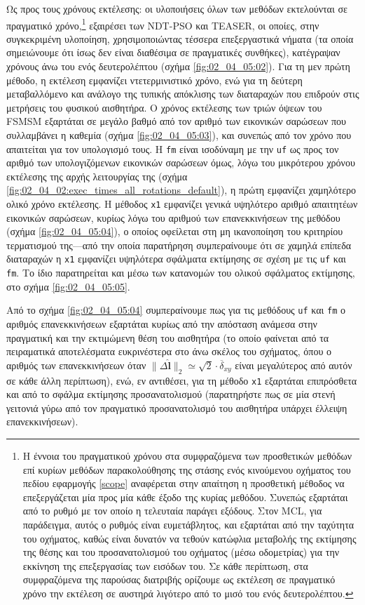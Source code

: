 Ως προς τους χρόνους εκτέλεσης: οι υλοποιήσεις όλων των μεθόδων εκτελούνται σε
πραγματικό χρόνο,\footnote{Η έννοια του πραγματικού χρόνου στα συμφραζόμενα των
προσθετικών μεθόδων επί κυρίων μεθόδων παρακολούθησης της στάσης ενός
κινούμενου οχήματος του πεδίου εφαρμογής \ref{scope} αναφέρεται στην απαίτηση η
προσθετική μέθοδος να επεξεργάζεται μία προς μία κάθε έξοδο της κυρίας μεθόδου.
Συνεπώς εξαρτάται από το ρυθμό με τον οποίο η τελευταία παράγει εξόδους.  Στον
MCL, για παράδειγμα, αυτός ο ρυθμός είναι ευμετάβλητος, και εξαρτάται από την
ταχύτητα του οχήματος, καθώς είναι δυνατόν να τεθούν κατώφλια μεταβολής της
εκτίμησης της θέσης και του προσανατολισμού του οχήματος (μέσω οδομετρίας) για
την εκκίνηση της επεξεργασίας των εισόδων του. Σε κάθε περίπτωση, στα
συμφραζόμενα της παρούσας διατριβής ορίζουμε ως εκτέλεση σε πραγματικό χρόνο
την εκτέλεση σε αυστηρά λιγότερο από το μισό του ενός δευτερολέπτου.}
εξαιρέσει των NDT-PSO και TEASER, οι οποίες, στην συγκεκριμένη υλοποίηση,
χρησιμοποιώντας τέσσερα επεξεργαστικά νήματα (τα οποία σημειώνουμε ότι ίσως δεν
είναι διαθέσιμα σε πραγματικές συνθήκες), κατέγραψαν χρόνους άνω του ενός
δευτερολέπτου (σχήμα \ref{fig:02_04_05:02}). Για τη μεν πρώτη μέθοδο, η
εκτέλεση εμφανίζει ντετερμινιστικό χρόνο, ενώ για τη δεύτερη μεταβαλλόμενο και
ανάλογο της τυπικής απόκλισης των διαταραχών που επιδρούν στις μετρήσεις του
φυσικού αισθητήρα. Ο χρόνος εκτέλεσης των τριών όψεων του FSMSM εξαρτάται σε
μεγάλο βαθμό από τον αριθμό των εικονικών σαρώσεων που συλλαμβάνει η καθεμία
(σχήμα \ref{fig:02_04_05:03}), και συνεπώς από τον χρόνο που απαιτείται για τον
υπολογισμό τους. Η \texttt{fm} είναι ισοδύναμη με την \texttt{uf} ως προς τον
αριθμό των υπολογιζόμενων εικονικών σαρώσεων όμως, λόγω του μικρότερου χρόνου
εκτέλεσης της αρχής λειτουργίας της (σχήμα
\ref{fig:02_04_02:exec_times_all_rotations_default}), η πρώτη εμφανίζει
χαμηλότερο ολικό χρόνο εκτέλεσης. Η μέθοδος \texttt{x1} εμφανίζει γενικά
υψηλότερο αριθμό απαιτητέων εικονικών σαρώσεων, κυρίως λόγω του αριθμού των
επανεκκινήσεων της μεθόδου (σχήμα \ref{fig:02_04_05:04}), ο οποίος οφείλεται
στη μη ικανοποίηση του κριτηρίου τερματισμού της---από την οποία παρατήρηση
συμπεραίνουμε ότι σε χαμηλά επίπεδα διαταραχών η \texttt{x1} εμφανίζει
υψηλότερα σφάλματα εκτίμησης σε σχέση με τις \texttt{uf} και \texttt{fm}. Το
ίδιο παρατηρείται και μέσω των κατανομών του ολικού σφάλματος εκτίμησης, στο
σχήμα \ref{fig:02_04_05:05}.

Από το σχήμα \ref{fig:02_04_05:04} συμπεραίνουμε πως για τις μεθόδους
\texttt{uf} και \texttt{fm} ο αριθμός επανεκκινήσεων εξαρτάται κυρίως από την
απόσταση ανάμεσα στην πραγματική και την εκτιμώμενη θέση του αισθητήρα (το
οποίο φαίνεται από τα πειραματικά αποτελέσματα ευκρινέστερα στο άνω σκέλος του
σχήματος, όπου ο αριθμός των επανεκκινήσεων όταν $\|\Delta \hat{\bm{l}}\|_2
\simeq \sqrt{2}\cdot\overline{\delta}_{xy}$ είναι μεγαλύτερος από αυτόν σε
κάθε άλλη περίπτωση), ενώ, εν αντιθέσει, για τη μέθοδο \texttt{x1} εξαρτάται
επιπρόσθετα και από το σφάλμα εκτίμησης προσανατολισμού (παρατηρήστε πως σε μία
στενή γειτονιά γύρω από τον πραγματικό προσανατολισμό του αισθητήρα υπάρχει
έλλειψη επανεκκινήσεων).

